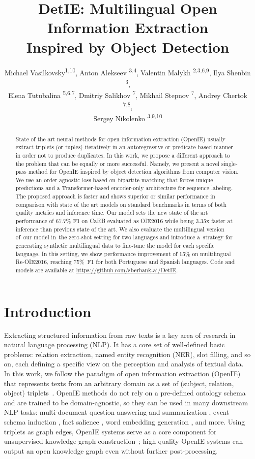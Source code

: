 \documentclass[letterpaper]{article} \usepackage{aaai22}  \usepackage{times}  \usepackage{helvet}  \usepackage{courier}  \usepackage[hyphens]{url}  \usepackage{graphicx} \usepackage{placeins}
\title{DetIE: Multilingual Open Information Extraction \\ Inspired by Object Detection}
\author {
    Michael Vasilkovsky\textsuperscript{\rm 1,10},
    Anton Alekseev \textsuperscript{\rm 3,4},
    Valentin Malykh \textsuperscript{\rm 2,3,6,9},
    Ilya Shenbin \textsuperscript{\rm 3}, \\
    Elena Tutubalina \textsuperscript{\rm 5,6,7},
    Dmitriy Salikhov \textsuperscript{\rm 7},
    Mikhail Stepnov \textsuperscript{\rm 7},
    Andrey Chertok \textsuperscript{\rm 7,8}, \\
    Sergey Nikolenko \textsuperscript{\rm 3,9,10}
}
\newcommand{\added}[1]{\textcolor{black}{#1}}
\begin{document}
\maketitle

\begin{abstract}
State of the art neural methods for open information extraction (OpenIE) usually extract triplets (or tuples) iteratively in an autoregressive or predicate-based manner in order not to produce duplicates. In this work, we propose a different approach to the problem that can be equally or more successful. Namely, we present a novel single-pass method for OpenIE inspired by object detection algorithms from computer vision. We use an order-agnostic loss based on bipartite matching that forces unique predictions and a Transformer-based encoder-only architecture for sequence labeling. The proposed approach is faster and shows superior or similar performance in comparison with state of the art models on standard benchmarks in terms of both quality metrics and inference time. Our model sets the new state of the art performance of 67.7\% F1 on CaRB evaluated as OIE2016 while being 3.35x faster at inference \added{than previous state of the art}. We also evaluate the multilingual version of~our model in~the zero-shot setting for two languages and introduce a~strategy for generating synthetic multilingual data to fine-tune the model for each specific language. In this setting, we show performance improvement \added{of 15\%} on multilingual Re-OIE2016, reaching 75\%~F1 for both Portuguese and Spanish languages. Code and models are available at \url{https://github.com/sberbank-ai/DetIE}.
\end{abstract}

\section{Introduction}\label{sec:introduction}
Extracting structured information from raw texts is a key area of research in natural language processing (NLP). It has a core set of well-defined basic problems: relation extraction, named entity recognition (NER), slot filling, and so on, each defining a specific view on the perception and analysis of textual data. 
In this work, we follow the paradigm of open information extraction (OpenIE)
that represents texts from an arbitrary domain as a set of (subject, relation, object) triplets~\cite{yates-etal-2007-textrunner}.
OpenIE methods do not rely on a pre-defined ontology schema and are trained to be domain-agnostic, so they can be used in many downstream NLP tasks: multi-document question answering and summarization \cite{DBLP:journals/corr/abs-1910-08435}, event schema induction \cite{balasubramanian-etal-2013-generating}, fact salience \cite{ponza-etal-2018-facts}, word embedding generation \cite{stanovsky-etal-2015-open}, and more. Using triplets as graph edges, OpenIE systems serve as a core component for unsupervised knowledge graph construction~\cite{Mausam2016OpenIE}; high-quality OpenIE systems can output an open knowledge graph even without further post-processing.
\end{document}
